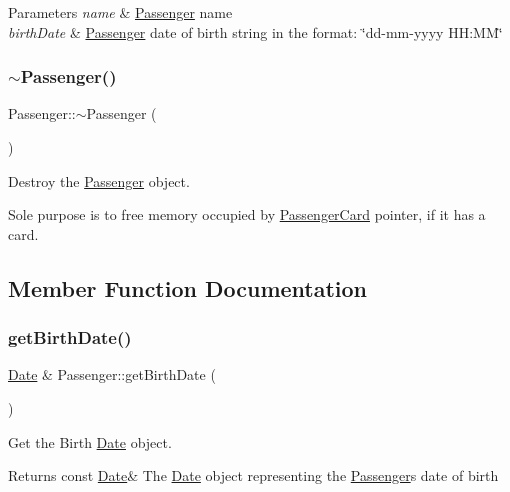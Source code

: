 \begin{DoxyParams}{Parameters}
{\em name} & \mbox{\hyperlink{classPassenger}{Passenger}} name \\
\hline
{\em birth\+Date} & \mbox{\hyperlink{classPassenger}{Passenger}} date of birth string in the format\+: \char`\"{}dd-\/mm-\/yyyy H\+H\+:\+M\+M\char`\"{} \\
\hline
\end{DoxyParams}
\mbox{\label{classPassenger_a6a6747cafd45d2c85db2ec4e873be3c7}} 
\subsubsection{\texorpdfstring{$\sim$\+Passenger()}{~Passenger()}}
{\footnotesize\ttfamily Passenger\+::$\sim$\+Passenger (\begin{DoxyParamCaption}{ }\end{DoxyParamCaption})}



Destroy the \mbox{\hyperlink{classPassenger}{Passenger}} object. 

Sole purpose is to free memory occupied by \mbox{\hyperlink{classPassengerCard}{Passenger\+Card}} pointer, if it has a card. 

\subsection{Member Function Documentation}
\mbox{\label{classPassenger_a23e16eaaf1c1927240380aa02e9d44a4}} 
\subsubsection{\texorpdfstring{get\+Birth\+Date()}{getBirthDate()}}
{\footnotesize\ttfamily \mbox{\hyperlink{classDate}{Date}} \& Passenger\+::get\+Birth\+Date (\begin{DoxyParamCaption}{ }\end{DoxyParamCaption})}



Get the Birth \mbox{\hyperlink{classDate}{Date}} object. 

\begin{DoxyReturn}{Returns}
const \mbox{\hyperlink{classDate}{Date}}\& The \mbox{\hyperlink{classDate}{Date}} object representing the \mbox{\hyperlink{classPassenger}{Passenger}}\textquotesingle{}s date of birth 
\end{DoxyReturn}
\mbox{\label{classPassenger_ae8d5310db80438702dec5f4d649289f1}} 
